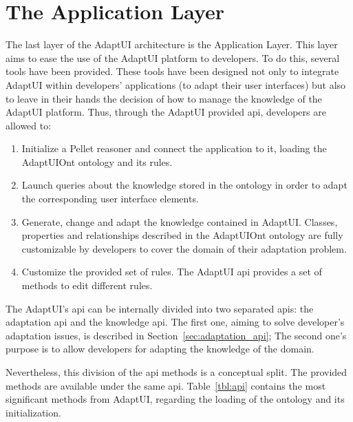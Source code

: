 \section{The Application Layer}
\label{sec:application_layer}

The last layer of the AdaptUI architecture is the Application Layer. This layer
aims to ease the use of the AdaptUI platform to developers. To do this, several
tools have been provided. These tools have been designed not only to integrate
AdaptUI within developers' applications (to adapt their user interfaces) but also
to leave in their hands the decision of how to manage the knowledge of the AdaptUI
platform. Thus, through the AdaptUI provided \ac{api}, developers are allowed to:

\begin{enumerate}[label=\alph*)]
 \item Initialize a Pellet reasoner and connect the application to it, loading
 the AdaptUIOnt ontology and its rules.
 
 \item Launch queries about the knowledge stored in the ontology in order to
 adapt the corresponding user interface elements.
 
 \item Generate, change and adapt the knowledge contained in AdaptUI. Classes,
 properties and relationships described in the AdaptUIOnt ontology are fully
 customizable by developers to cover the domain of their adaptation problem.
 
 \item Customize the provided set of rules. The AdaptUI \ac{api} provides a set of
 methods to edit different rules.
\end{enumerate}

The AdaptUI's \ac{api} can be internally divided into two separated \acp{api}:
the adaptation \ac{api} and the knowledge \ac{api}. The first one, aiming to solve 
developer's adaptation issues, is described in Section~\ref{sec:adaptation_api};
The second one's purpose is to allow developers for adapting the knowledge of the 
domain.

Nevertheless, this division of the \ac{api} methods is a conceptual split. The
provided methods are available under the same \ac{api}. Table~\ref{tbl:api} 
contains the most significant methods from AdaptUI, regarding the loading of the 
ontology and its initialization.

\newpage

